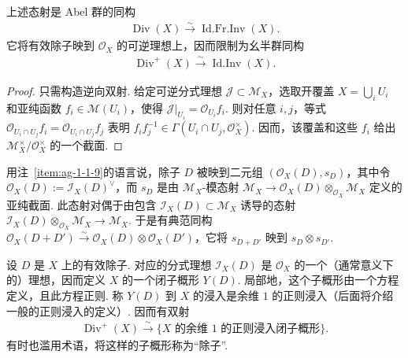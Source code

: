 \begin{proposition}\label{item:ag-1-1-11}
上述态射是 Abel 群的同构
\begin{align*}
\operatorname{Div}(X)\xrightarrow\sim\operatorname{Id.Fr.Inv}(X).
\end{align*}
它将有效除子映到 $\mathcal O_X$ 的可逆理想上，因而限制为幺半群同构
\begin{align*}
\operatorname{Div}^+(X)\xrightarrow\sim\operatorname{Id.Inv}(X).
\end{align*}
\end{proposition}
\begin{proof}
只需构造逆向双射. 给定可逆分式理想 $\mathcal J\subset\mathcal M_X$，选取开覆盖 $X=\bigcup_iU_i$ 和亚纯函数 $f_i\in\mathcal M(U_i)$，使得 $\mathcal J|_{U_i}=\mathcal O_{U_i}f_i$. 则对任意 $i,j$，等式 $\mathcal O_{U_i\cap U_j}f_i=\mathcal O_{U_i\cap U_j}f_j$ 表明 $f_if_j^{-1}\in\Gamma(U_i\cap U_j,\mathcal O_X^\times)$. 因而，该覆盖和这些 $f_i$ 给出 $\mathcal M_X^\times/\mathcal O_X^\times$ 的一个截面.
\end{proof}
用注~\ref{item:ag-1-1-9}的语言说，除子 $D$ 被映到二元组 $(\mathcal O_X(D),s_D)$，其中令 $\mathcal O_X(D):=\mathcal I_X(D)^\vee$，而 $s_D$ 是由 $\mathcal M_X$-模态射 $\mathcal M_X\longrightarrow\mathcal O_X(D)\otimes_{\mathcal O_X}\mathcal M_X$ 定义的亚纯截面. 此态射对偶于由包含 $\mathcal I_X(D)\subset\mathcal M_X$ 诱导的态射 $\mathcal I_X(D)\otimes_{\mathcal O_X}\mathcal M_X\longrightarrow\mathcal M_X$.
于是有典范同构 $\mathcal O_X(D+D')\xrightarrow\sim\mathcal O_X(D)\otimes\mathcal O_X(D')$，它将 $s_{D+D'}$ 映到 $s_D\otimes s_{D'}$.
\begin{numpara}[有效除子所对应的子概形]\label{item:ag-1-1-12}
设 $D$ 是 $X$ 上的有效除子. 对应的分式理想 $\mathcal I_X(D)$ 是 $\mathcal O_X$ 的一个（通常意义下的）理想，因而定义 $X$ 的一个闭子概形 $Y(D)$. 局部地，这个子概形由一个方程定义，且此方程正则. 称 $Y(D)$ 到 $X$ 的浸入是余维 $1$ 的正则浸入（后面将介绍一般的正则浸入的定义）. 因而有双射
\begin{align*}
\operatorname{Div}^+(X)\xrightarrow\sim
\{\text{$X$ 的余维 $1$ 的正则浸入闭子概形}\}.
\end{align*}
有时也滥用术语，将这样的子概形称为``除子''.
\end{numpara}

